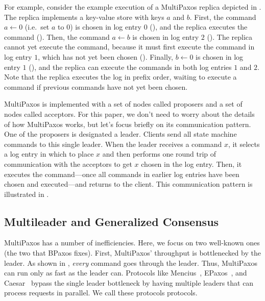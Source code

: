 For example, consider the example execution of a MultiPaxos replica depicted in
. The replica implements a key-value store
with keys $a$ and $b$. First, the command $a \gets 0$ (i.e.\ set $a$ to $0$) is
chosen in log entry $0$ (), and the replica
executes the command (). Then, the command
$a \gets b$ is chosen in log entry $2$ ().
The replica cannot yet execute the command, because it must first execute the
command in log entry $1$, which has not yet been chosen
().  Finally, $b \gets 0$ is chosen in log
entry $1$ (), and the replica can execute
the commands in both log entries $1$ and $2$. Note that the replica executes
the log in prefix order, waiting to execute a command if previous commands have
not yet been chosen.

{}

MultiPaxos is implemented with a set of nodes called proposers and a set of
nodes called acceptors. For this paper, we don't need to worry about the
details of how MultiPaxos works, but let's focus briefly on its communication
pattern. One of the proposers is designated a leader. Clients send all state
machine commands to this single leader. When the leader receives a command $x$,
it selects a log entry in which to place $x$ and then performs one round trip
of communication with the acceptors to get $x$ chosen in the log entry. Then,
it executes the command---once all commands in earlier log entries have been
chosen and executed---and returns to the client.  This communication pattern is
illustrated in .

{}

\subsection{Multileader and Generalized Consensus}
MultiPaxos has a number of inefficiencies. Here, we focus on two well-known
ones (the two that BPaxos fixes). First, MultiPaxos' throughput is bottlenecked
by the leader. As shown in , \emph{every}
command goes through the leader. Thus, MultiPaxos can run only as fast as the
leader can. Protocols like Mencius~\cite{mao2008mencius},
EPaxos~\cite{moraru2013there}, and Caesar~\cite{arun2017speeding} bypass the
single leader bottleneck by having multiple leaders that can process requests
in parallel. We call these protocols  protocols.

